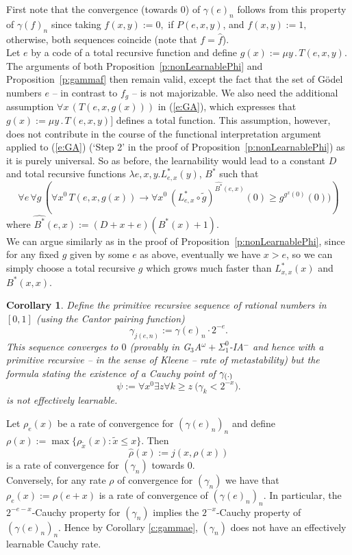 \documentclass[1p]{elsarticle}
\theoremstyle{plain}
\newtheorem{cor}[thm]{Corollary}
\theoremstyle{definition}
\theoremstyle{remark}
\renewenvironment{proof}[1][]{\noindent{\bf Proof{#1}. }}{\nopagebreak[4]{\hspace*{\fill}
  $\Box$              %
 }{\vspace{2ex}}}
\theoremstyle{definition}
\begin{document}
{\begin{proof}
First note that the convergence (towards $0$) 
of $\gamma(e)_n$ follows from this property of $\gamma(f)_n$ 
since taking $f(x,y):=0,$ if $P(e,x,y)$, 
and $f(x,y):=1,$ otherwise, both sequences coincide (note that 
$f=\widehat{f}$).\\ 
Let $e$ by a code of a total recursive function and define $g(x):=\mu 
y\,.\,T(e,x,y).$
The arguments of both Proposition~\ref{p:nonLearnablePhi} and Proposition~\ref{p:gammaf} then remain valid,
except the fact that the set of 
G\"odel numbers $e$ -- in contrast to $f_g$  -- is not majorizable. 
We also need the additional assumption $\forall x\,(T(e,x,g(x)))$ in 
(\ref{e:GA}), which 
expresses that $g(x):=\mu y\,.\,T(e,x,y)]$ defines a total function. This 
assumption, however, does not contribute in the course of the functional 
interpretation argument applied to (\ref{e:GA}) (`Step 2' in the proof of 
Proposition~\ref{p:nonLearnablePhi}) as it is purely universal. 
So as before, the learnability would lead to a constant $D$ and 
total recursive functions $\lambda e,x,y.
L^*_{e,x}(y)$, $B^*$ such that
\[ \forall e\,\forall g\,\left(\forall x^0 \,T(e,x,g(x))\rightarrow 
\forall x^0\ (L^*_{e,x}\circ \tilde{g})^{\widehat{B^*}(e,x)}(0)
\geq g^{g^{x}(0)}(0))\right)\] where 
$\widehat{B^*}(e,x):=(D+x+e)(B^*(x)+1).$  \\ 
We can argue similarly as in the proof of Proposition~\ref{p:nonLearnablePhi}, 
since for any fixed $g$ given by some $e$ as above, eventually we have $x>e$, 
so we can simply choose
a total recursive $g$ which grows much faster than $L^*_{x,x}(x)$ 
and $B^*(x,x)$.
\end{proof}

\begin{cor}\label{c:gammaee}
Define the primitive recursive sequence of rational numbers in $[0,1]$  
(using the Cantor pairing function)
\[
\gamma_{j(e,n)}:= \gamma(e)_n\cdot 2^{-e}.
\]
This sequence converges to $0$ (provably in {\rm 
G$_3$A$^{\omega}+\Sigma^0_1$-IA$^-$} and hence with a primitive recursive -- 
in the sense of Kleene -- rate of metastability) but 
the formula stating the existence of a Cauchy point of $\gamma_{(\cdot)}$
\[
\psi:=\forall x^0\exists z \forall k\geq z\ \big( \gamma_k<2^{-x} \big).
\]
is not effectively learnable.
\end{cor}
\begin{proof} 
Let $\rho_e(x)$ be a rate of convergence for $(\gamma(e)_n)_n$ and define 
$\rho(x):=\max\{ \rho_{\tilde{x}}(x):\tilde{x}\le x\}.$ Then 
\[ \widehat{\rho}(x):=j(x,\rho(x)) \] is a rate of convergence for 
$(\gamma_n)$ towards $0.$
\\
Conversely, for any rate $\rho$ of convergence for $(\gamma_n)$ we have that 
$\rho_e(x):=\rho(e+x)$ is a rate of convergence of $(\gamma(e)_n)_n$. In 
particular, the $2^{-e-x}$-Cauchy property for $(\gamma_n)$ implies the 
$2^{-x}$-Cauchy property of $(\gamma(e)_n)_n.$ Hence by Corollary 
\ref{c:gammae}, 
$(\gamma_n)$ does not have an effectively learnable Cauchy rate.
\end{proof}


}
\end{document}
